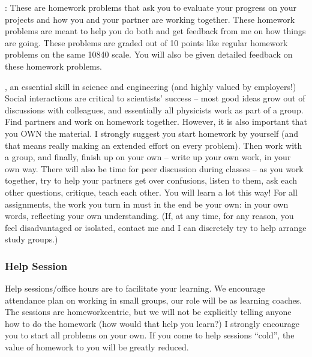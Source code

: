 \documentclass[letterpaper,10pt,english]{jupyterBook}
\begin{document}
\sphinxAtStartPar
{}: These are homework problems that ask you to evaluate your progress on your projects and how you and your partner are working together.  These homework problems are meant to help you do both and get feedback from me on how things are going. These problems are graded out of 10 points like regular homework problems on the same 10\sphinxhyphen{}8\sphinxhyphen{}4\sphinxhyphen{}0 scale. You will also be given detailed feedback on these homework problems.

\sphinxAtStartPar
{}, an essential skill in science and engineering (and highly valued by employers!) Social interactions are critical to scientists’ success – most good ideas grow out of discussions with colleagues, and essentially all physicists work as part of a group. Find partners and work on homework together. However, it is also important that you OWN the material. I strongly suggest you start homework by yourself (and that means really making an extended effort on every problem). Then work with a group, and finally, finish up on your own – write up your own work, in your own way. There will also be time for peer discussion during classes – as you work together, try to help your partners get over confusions, listen to them, ask each other questions, critique, teach each other. You will learn a lot this way! For all assignments, the work you turn in must in the end be your own: in your own words, reflecting your own understanding. (If, at any time, for any reason, you feel disadvantaged or isolated, contact me and I can discretely try to help arrange study groups.)


\subsubsection{Help Session}
\label{\detokenize{content/0_course/design:help-session}}
\sphinxAtStartPar
Help sessions/office hours are to facilitate your learning. We encourage attendance \sphinxhyphen{} plan on working in small groups, our role will be as learning coaches. The sessions are homework\sphinxhyphen{}centric, but we will not be explicitly telling anyone how to do the homework (how would that help you learn?) I strongly encourage you to start all problems on your own. If you come to help sessions “cold”, the value of homework to you will be greatly reduced.
\end{document}
